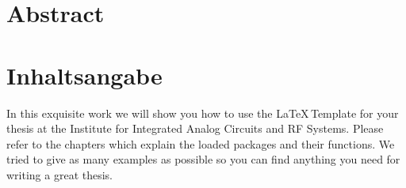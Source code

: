 { \chapter{Abstract} 		}
{ \chapter{Inhaltsangabe}	}
In this exquisite work we will show you how to use the \LaTeX \,Template for your thesis at the Institute for Integrated Analog Circuits and RF Systems. Please refer to the chapters which explain the loaded packages and their functions. We tried to give as many examples as possible so you can find anything you need for writing a great thesis.

